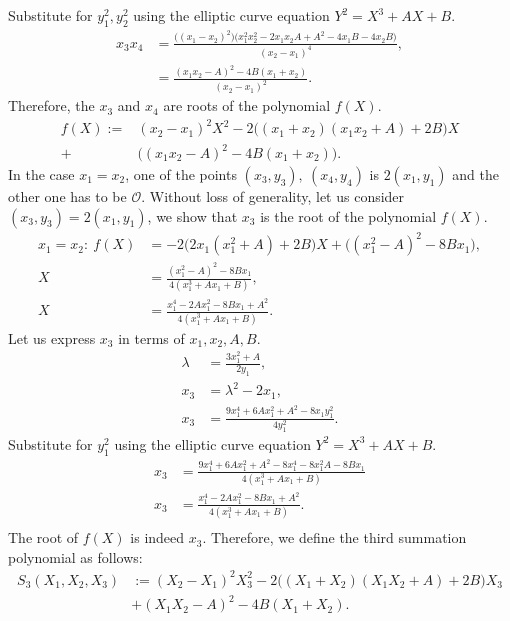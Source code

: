 \documentclass[thesis=M,english]{FITthesis}[2012/10/20]
\theoremstyle{remark}
\theoremstyle{definition}
\begin{document}
\vphantom{.}
Substitute for $y_1^2,y_2^2$ using the elliptic curve equation $Y^2 = X^3 + AX + B.$\\
\vphantom{.}
\begin{align*}
x_3x_4 &= \frac{\bigg((x_1-x_2)^2\bigg)\bigg(x_{1}^{2} x_{2}^{2} - 2 x_{1} x_{2} A + A^{2} - 4 x_{1} B - 4 x_{2} B\bigg)}{(x_2-x_1)^4},\\
&= \frac{(x_1x_2-A)^2 - 4B(x_1+x_2)}{(x_2-x_1)^2}.
\end{align*}
Therefore, the $x_3$ and $x_4$ are roots of the polynomial $f(X)$.
\begin{align*}
f(X) :=& (x_2-x_1)^2X^2-2\bigg((x_1+x_2)(x_1x_2 + A) + 2B\bigg)X \\
+& \bigg((x_1x_2-A)^2 - 4B(x_1+x_2)\bigg).
\end{align*}
In the case $x_1=x_2$, one of the points $(x_3,y_3),\ (x_4,y_4)$ is $2(x_1,y_1)$ and the other one has to be $\mathcal{O}$. Without loss of generality, let us consider $(x_3,y_3) = 2(x_1,y_1)$, we show that $x_3$ is the root of the polynomial $f(X)$.
\begin{align*}
x_1 = x_2:\ f(X) &= -2\bigg(2x_1(x_1^2+A)+2B\bigg)X +\bigg((x_1^2-A)^2-8Bx_1\bigg),
\\ X &= \frac{(x_1^2-A)^2-8Bx_1}{4(x_1^3+Ax_1+B)}, \\ 
	X &= \frac{x_1^4-2Ax_1^2-8Bx_1+A^2}{4(x_1^3+Ax_1+B)}.
\end{align*}
Let us express $x_3$ in terms of $x_1,x_2,A,B$.
\begin{align*}
\lambda &= \frac{3x_1^2+A}{2y_1}, \\
	x_3 &= \lambda^2 -2x_1, \\
	x_3 &= \frac{9 x_{1}^{4} + 6 Ax_{1}^{2} + A^{2} -8x_1y_1^2}{4y_1^2}.
\end{align*}
Substitute for $y_1^2$ using the elliptic curve equation $Y^2 = X^3 + AX + B.$
\begin{align*}
x_3 &= \frac{9 x_{1}^{4} + 6A x_{1}^{2} + A^{2}-8 x_{1}^{4} - 8 x_{1}^{2} A - 8B x_{1}}{4(x_1^3+Ax_1+B)} \\
x_3 &= \frac{x_1^4-2Ax_1^2 - 8Bx_1+ A^2}{4(x_1^3+Ax_1+B)}.\\
\end{align*}
The root of $f(X)$ is indeed $x_3$.
Therefore, we define the third summation polynomial as follows:
\begin{align*}
S_3(X_1,X_2,X_3) &:= (X_2-X_1)^2X_3^2-2\bigg((X_1+X_2)(X_1X_2 + A) + 2B\bigg)X_3\\
&+ (X_1X_2-A)^2 - 4B(X_1+X_2).
\end{align*}
\end{document}
